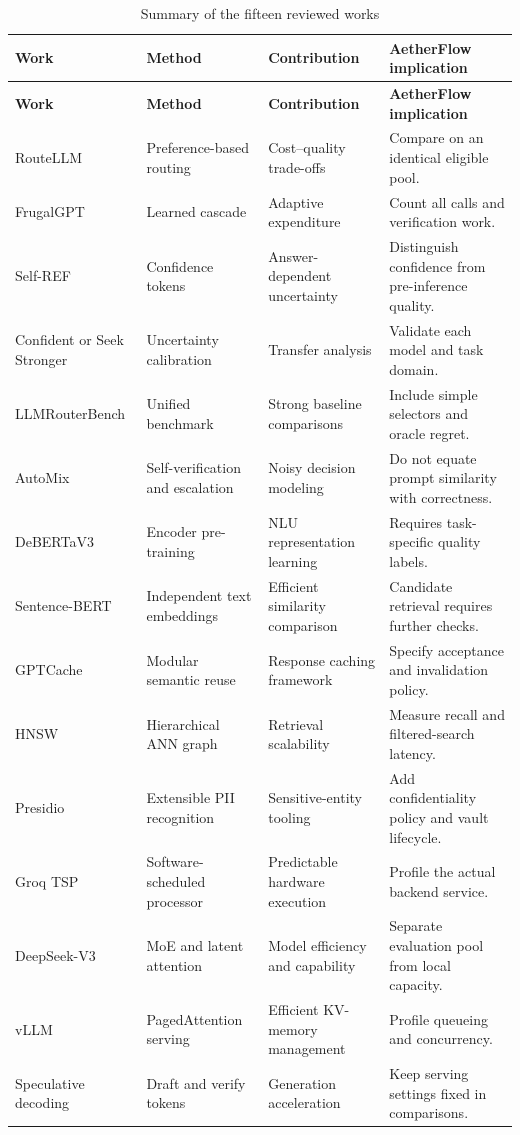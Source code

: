 \documentclass{FastFyp}
\begin{document}
\begingroup\small
\setlength{\tabcolsep}{4pt}
\begin{longtable}{|P{2.7cm}|P{3.6cm}|P{3.9cm}|P{3.9cm}|}
\caption{Summary of the fifteen reviewed works}\label{tab:lit_summary}\\\hline
\textbf{Work} & \textbf{Method} & \textbf{Contribution} & \textbf{AetherFlow implication}\\\hline\endfirsthead
\hline\textbf{Work} & \textbf{Method} & \textbf{Contribution} & \textbf{AetherFlow implication}\\\hline\endhead
RouteLLM & Preference-based routing & Cost--quality trade-offs & Compare on an identical eligible pool.\\\hline
FrugalGPT & Learned cascade & Adaptive expenditure & Count all calls and verification work.\\\hline
Self-REF & Confidence tokens & Answer-dependent uncertainty & Distinguish confidence from pre-inference quality.\\\hline
Confident or Seek Stronger & Uncertainty calibration & Transfer analysis & Validate each model and task domain.\\\hline
LLMRouterBench & Unified benchmark & Strong baseline comparisons & Include simple selectors and oracle regret.\\\hline
AutoMix & Self-verification and escalation & Noisy decision modeling & Do not equate prompt similarity with correctness.\\\hline
DeBERTaV3 & Encoder pre-training & NLU representation learning & Requires task-specific quality labels.\\\hline
Sentence-BERT & Independent text embeddings & Efficient similarity comparison & Candidate retrieval requires further checks.\\\hline
GPTCache & Modular semantic reuse & Response caching framework & Specify acceptance and invalidation policy.\\\hline
HNSW & Hierarchical ANN graph & Retrieval scalability & Measure recall and filtered-search latency.\\\hline
Presidio & Extensible PII recognition & Sensitive-entity tooling & Add confidentiality policy and vault lifecycle.\\\hline
Groq TSP & Software-scheduled processor & Predictable hardware execution & Profile the actual backend service.\\\hline
DeepSeek-V3 & MoE and latent attention & Model efficiency and capability & Separate evaluation pool from local capacity.\\\hline
vLLM & PagedAttention serving & Efficient KV-memory management & Profile queueing and concurrency.\\\hline
Speculative decoding & Draft and verify tokens & Generation acceleration & Keep serving settings fixed in comparisons.\\\hline
\end{longtable}\endgroup
\end{document}
